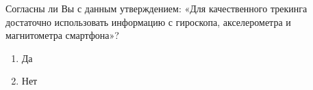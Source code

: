 
Согласны ли Вы с данным утверждением: «Для качественного трекинга достаточно использовать информацию с гироскопа, акселерометра и магнитометра смартфона»?

\begin{enumerate}
    \item Да
    \item Нет
\end{enumerate}


